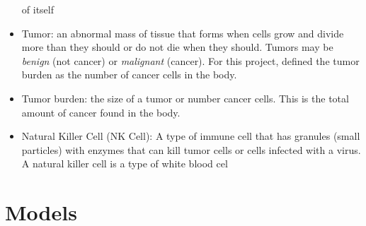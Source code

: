 \documentclass[11pt]{amsart}
\begin{document}
\begin{itemize}
of itself
	\item Tumor: an abnormal mass of tissue that forms when cells grow and divide more than they should or do not die when they should. Tumors may be \textit{benign} (not cancer) or \textit{malignant} (cancer). For this project, defined the tumor burden as the number of cancer cells in the body.
	\item Tumor burden: the size of a tumor or number cancer cells. This is the total amount of cancer found in the body.
        \item Natural Killer Cell (NK Cell): A type of immune cell that has granules (small particles) with enzymes that can kill tumor cells or cells infected with a virus. A natural killer cell is a type of white blood cel
\end{itemize}

\section{Models}
\label{appendix: models}
\end{document}
